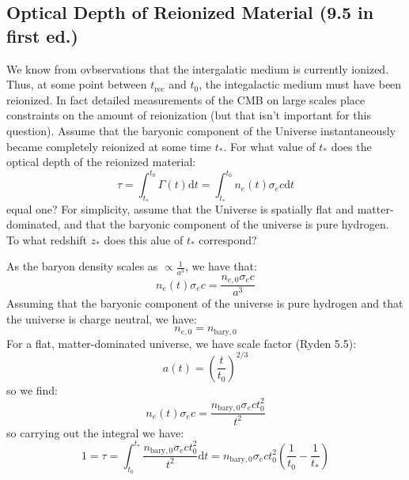 \subsection*{Optical Depth of Reionized Material (9.5 in first ed.)}
\begin{tcolorbox}
    We know from ovbservations that the intergalatic medium is currently ionized. Thus, at some point between $t_{\text{rec}}$ and $t_0$, the integalactic medium must have been reionized. In fact detailed measurements of the CMB on large scales place constraints on the amount of reionization (but that isn't important for this question). Assume that the baryonic component of the Universe instantaneously became completely reionized at some time $t_*$. For what value of $t_*$ does the optical depth of the reionized material:
    \begin{equation}
        \tau = \int_{t_*}^{t_0}\Gamma(t)\mathrm d t = \int_{t_*}^{t_0} n_e(t)\sigma_e c \mathrm d t
    \end{equation}
    equal one? For simplicity, assume that the Universe is spatially flat and matter-dominated, and that the baryonic component of the universe is pure hydrogen. To what redshift $z_*$ does this alue of $t_*$ correspond?
\end{tcolorbox}
\noindent
As the baryon density scales as $\propto \frac{1}{a^3}$, we have that:
\begin{equation}
    n_{e}(t)\sigma_e c = \frac{n_{e, 0}\sigma_e c}{a^3}
\end{equation}
Assuming that the baryonic component of the universe is pure hydrogen and that the universe is charge neutral, we have:
\begin{equation}
    n_{e, 0} = n_{\text{bary}, 0}
\end{equation}
For a flat, matter-dominated universe, we have scale factor (Ryden 5.5):
\begin{equation}
    a(t) = \left(\frac{t}{t_0}\right)^{2/3}
\end{equation}
so we find:
\begin{equation}
    n_{e}(t)\sigma_e c = \frac{n_{\text{bary}, 0}\sigma_e c t_0^2}{t^2}
\end{equation}
so carrying out the integral we have:
\begin{equation}
    1 = \tau = \int_{t_0}^{t_*}\frac{n_{\text{bary}, 0}\sigma_e c t_0^2}{t^2} \mathrm d t = n_{\text{bary}, 0}\sigma_e c t_0^2\left(\frac{1}{t_0} - \frac{1}{t_*}\right)
\end{equation}
